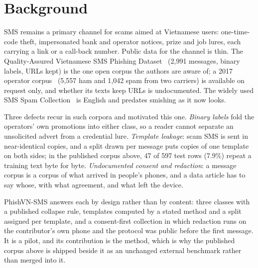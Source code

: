 \section*{Background}
SMS remains a primary channel for scams aimed at Vietnamese users: one-time-code theft,
impersonated bank and operator notices, prize and job lures, each carrying a link or a
call-back number. Public data for the channel is thin. The Quality-Assured Vietnamese SMS
Phishing Dataset~\cite{qavn_sms} (2{,}991 messages, binary labels, URLs kept) is the one open
corpus the authors are aware of; a 2017 operator corpus~\cite{operator2017_sms} (5{,}557 ham
and 1{,}042 spam from two carriers) is available on request only, and whether its texts keep
URLs is undocumented. The widely used SMS Spam Collection~\cite{uci_sms} is English and
predates smishing as it now looks.

Three defects recur in such corpora and motivated this one. \emph{Binary labels} fold the
operators' own promotions into either class, so a reader cannot separate an unsolicited advert
from a credential lure. \emph{Template leakage}: scam SMS is sent in near-identical copies, and
a split drawn per message puts copies of one template on both sides; in the published corpus
above, 47 of 597 test rows (7.9\%) repeat a training text byte for byte. \emph{Undocumented
consent and redaction}: a message corpus is a corpus of what arrived in people's phones, and a
data article has to say whose, with what agreement, and what left the device.

PhishVN-SMS answers each by design rather than by content: three classes with a published
collapse rule, templates computed by a stated method and a split assigned per template, and a
consent-first collection in which redaction runs on the contributor's own phone and the protocol
was public before the first message. It is a pilot, and its contribution is the method, which is
why the published corpus above is shipped beside it as an unchanged external benchmark rather
than merged into it.
